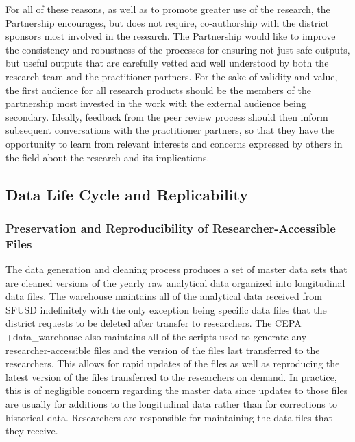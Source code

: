 \documentclass[
]{WileySix}
\begin{document}
For all of these reasons, as well as to promote greater use of the research, the Partnership encourages, but does not require, co-authorship with the district sponsors most involved in the research. The Partnership would like to improve the consistency and robustness of the processes for ensuring not just safe outputs, but useful outputs that are carefully vetted and well understood by both the research team and the practitioner partners. For the sake of validity and value, the first audience for all research products should be the members of the partnership most invested in the work with the external audience being secondary. Ideally, feedback from the peer review process should then inform subsequent conversations with the practitioner partners, so that they have the opportunity to learn from relevant interests and concerns expressed by others in the field about the research and its implications.

\hypertarget{data-life-cycle-and-replicability-4}{%
\subsection{Data Life Cycle and Replicability}\label{data-life-cycle-and-replicability-4}}

\hypertarget{preservation-and-reproducibility-of-researcher-accessible-files-4}{%
\subsubsection{Preservation and Reproducibility of Researcher-Accessible Files}\label{preservation-and-reproducibility-of-researcher-accessible-files-4}}

The data generation and cleaning process produces a set of master data sets that are cleaned versions of the yearly raw analytical data organized into longitudinal data files. The warehouse maintains all of the analytical data received from SFUSD indefinitely with the only exception being specific data files that the district requests to be deleted after transfer to researchers. The CEPA +data\_warehouse\textbar{} also maintains all of the scripts used to generate any researcher-accessible files and the version of the files last transferred to the researchers. This allows for rapid updates of the files as well as reproducing the latest version of the files transferred to the researchers on demand. In practice, this is of negligible concern regarding the master data since updates to those files are usually for additions to the longitudinal data rather than for corrections to historical data. Researchers are responsible for maintaining the data files that they receive.
\end{document}
